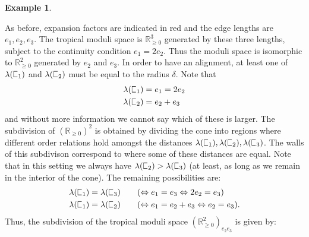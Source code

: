 \documentclass[11pt]{amsart}
\newcommand{\sqC}{\scalebox{0.8}[1.3]{$\sqsubset$}}
\newcommand{\PP}{\mathbb P}
\newcommand{\RR}{\mathbb{R}}
\theoremstyle{definition}
\theoremstyle{definition}
\newtheorem{example}[thm]{Example}
\begin{document}
\begin{example}
\begin{center}
\end{center}
As before, expansion factors are indicated in red and the edge lengths are $e_1,e_2,e_3$. The tropical moduli space is $\RR_{\geq 0}^3$ generated by these three lengths, subject to the continuity condition $e_1=2e_2$. Thus the moduli space is isomorphic to $\RR_{\geq 0}^2$ generated by $e_2$ and $e_3$. In order to have an alignment, at least one of $\lambda(\sqC_1)$ and $\lambda(\sqC_2)$ must be equal to the radius $\delta$. Note that
\begin{align*} \lambda(\sqC_1) & = e_1 = 2e_2 \\
\lambda(\sqC_2) & = e_2 + e_3\end{align*}
and without more information we cannot say which of these is larger. The subdivision of $(\RR_{\geq 0})^2$ is obtained by dividing the cone into regions where different order relations hold amongst the distances $\lambda(\sqC_1),\lambda(\sqC_2),\lambda(\sqC_3)$. The walls of this subdivison correspond to where some of these distances are equal. Note that in this setting we always have $\lambda(\sqC_2) > \lambda(\sqC_3)$ (at least, as long as we remain in the interior of the cone). The remaining possibilities are:
\begin{align*} \lambda(\sqC_1) & = \lambda(\sqC_3) \qquad (\Leftrightarrow e_1 = e_3 \Leftrightarrow 2e_2 = e_3) \\
\lambda(\sqC_1) & = \lambda(\sqC_2) \qquad (\Leftrightarrow e_1 = e_2 + e_3 \Leftrightarrow e_2 = e_3). \end{align*}
Thus, the subdivision of the tropical moduli space $(\RR_{\geq 0}^2)_{e_2 e_3}$ is given by:
\begin{center}
\end{center}
\end{example}
\end{document}
